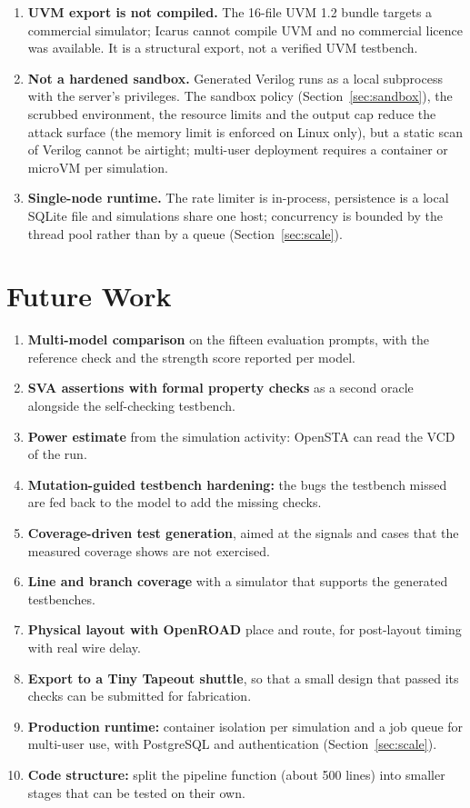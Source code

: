 \begin{enumerate}[label=\textbf{L\arabic*.},ref=L\arabic*]
10,000 neurons a day, and models are retired without notice. GitHub Copilot through
OpenCode is available only as , which cannot name the model
it used.
\item \textbf{UVM export is not compiled.} The 16-file UVM 1.2 bundle targets a
commercial simulator; Icarus cannot compile UVM and no commercial licence was
available. It is a structural export, not a verified UVM testbench.
\item \textbf{Not a hardened sandbox.} Generated Verilog runs as a local  subprocess with the server's privileges. The sandbox policy (Section~\ref{sec:sandbox}), the scrubbed environment, the resource limits and the output cap reduce the attack surface (the memory limit is enforced on Linux only), but a static scan of Verilog cannot be airtight; multi-user deployment requires a container or microVM per simulation.
\item \textbf{Single-node runtime.} The rate limiter is in-process, persistence is a local SQLite file and simulations share one host; concurrency is bounded by the thread pool rather than by a queue (Section~\ref{sec:scale}).
\end{enumerate}

\section{Future Work}
\begin{enumerate}[label=\textbf{\arabic*.}]
\item \textbf{Multi-model comparison} on the fifteen evaluation prompts, with the
reference check and the strength score reported per model.
\item \textbf{SVA assertions with formal property checks} as a second oracle
alongside the self-checking testbench.
\item \textbf{Power estimate} from the simulation activity: OpenSTA can read the
VCD of the run.
\item \textbf{Mutation-guided testbench hardening:} the bugs the testbench missed are
fed back to the model to add the missing checks.
\item \textbf{Coverage-driven test generation}, aimed at the signals and cases that
the measured coverage shows are not exercised.
\item \textbf{Line and branch coverage} with a simulator that supports the generated
testbenches.
\item \textbf{Physical layout with OpenROAD} place and route, for post-layout timing
with real wire delay.
\item \textbf{Export to a Tiny Tapeout shuttle}, so that a small design that passed its
checks can be submitted for fabrication.
\item \textbf{Production runtime:} container isolation per simulation and a job queue
for multi-user use, with PostgreSQL and authentication (Section~\ref{sec:scale}).
\item \textbf{Code structure:} split the pipeline function (about 500 lines) into
smaller stages that can be tested on their own.
\end{enumerate}
